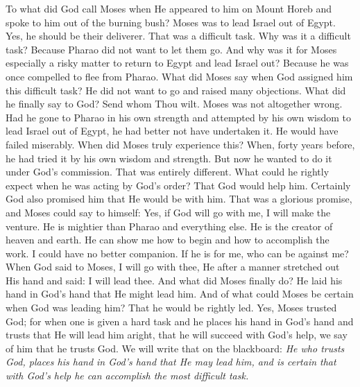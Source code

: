To what did God call Moses when He appeared to him on Mount Horeb and spoke to him out of the burning bush? Moses was to lead Israel out of Egypt. Yes, he should be their deliverer. That was a difficult task. Why was it a difficult task? Because Pharao did not want to let them go. And why was it for Moses especially a risky matter to return to Egypt and lead Israel out? Because he was once compelled to flee from Pharao. What did Moses say when God assigned him this difficult task? He did not want to go and raised many objections. What did he finally say to God? Send whom Thou wilt. Moses was not altogether wrong. Had he gone to Pharao in his own strength and attempted by his own wisdom to lead Israel out of Egypt, he had better not have undertaken it. He would have failed miserably. When did Moses truly experience this? When,
forty years before, he had tried it by his own wisdom and strength. But now he wanted to do it under God’s commission. That was entirely different. What could he rightly expect when he was acting by God’s order? That God would help him. Certainly God also promised him that He would be with him. That was a glorious promise, and Moses could say to himself: Yes, if God will go with me, I will make the venture. He is mightier than Pharao and everything else. He is the creator of heaven and earth. He can show me how to begin and how to accomplish the work. I could have no better companion. If he is for me, who can be against me? When God said to Moses, I will go with thee, He after a manner stretched out His hand and said: I will lead thee. And what did Moses finally do? He laid his hand in God’s hand that He might lead him. And of what could Moses be certain when God was leading him? That he would be rightly led. Yes, Moses trusted God; for when one is given a hard task and he places his hand in God’s hand and trusts that He will lead him aright, that he will succeed with God’s help, we say of him that he trusts God. We will write that on the blackboard: \emph{He who trusts God, places his hand in God’s hand that He may lead him, and is certain that with God’s help he can accomplish the most difficult task.}

